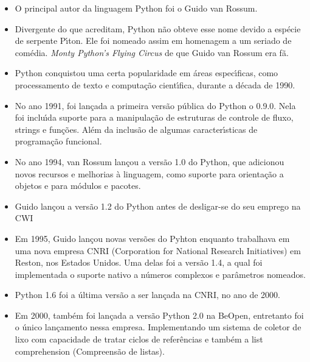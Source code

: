 \begin{itemize} [itemsep=5pt, parsep=5pt]

\item O principal autor da linguagem Python foi o Guido van Rossum.

\item Divergente do que acreditam, Python n\~{a}o obteve esse nome devido a esp\'{e}cie de serpente P\'{\i}ton. Ele foi nomeado assim em homenagem a um seriado de com\'{e}dia. \textit{Monty Python's Flying Circus} de que Guido van Rossum era f\~{a}.

\item Python conquistou uma certa popularidade em \'{a}reas espec\'{\i}ficas, como processamento de texto e  computa\c{c}\~{a}o cient\'{\i}fica, durante a d\'{e}cada de 1990.

\item No ano 1991, foi lan\c{c}ada a primeira vers\~{a}o p\'{u}blica do Python o 0.9.0. Nela foi inclu\'{\i}da suporte para a manipula\c{c}\~{a}o de estruturas de controle de fluxo, strings e fun\c{c}\~{o}es. Al\'{e}m da inclus\~{a}o de algumas caracter\'{\i}sticas de programa\c{c}\~{a}o funcional.

\item No ano 1994, van Rossum lan\c{c}ou a vers\~{a}o 1.0 do Python, que adicionou novos recursos e melhorias \`{a} linguagem, como suporte para orienta\c{c}\~{a}o a objetos e para m\'{o}dulos e pacotes.

\item Guido lan\c{c}ou a vers\~{a}o 1.2 do Python antes de desligar-se do seu emprego na CWI

\item Em 1995, Guido lan\c{c}ou novas vers\~{o}es do Pyhton enquanto trabalhava em uma nova empresa CNRI (Corporation for National Research Initiatives) em Reston, nos Estados Unidos. Uma delas foi a vers\~{a}o 1.4, a qual foi implementada o suporte nativo a n\'{u}meros complexos e par\^{a}metros nomeados.

\item Python 1.6 foi a \'{u}ltima vers\~{a}o a ser lan\c{c}ada na CNRI, no ano de 2000.

\item Em 2000, tamb\'{e}m foi lan\c{c}ada a vers\~{a}o Python 2.0 na BeOpen, entretanto foi o \'{u}nico lan\c{c}amento nessa empresa. Implementando um sistema de coletor de lixo com capacidade de tratar ciclos de refer\^{e}ncias e tamb\'{e}m a list comprehension (Compreens\~{a}o de listas).


\end{itemize}
